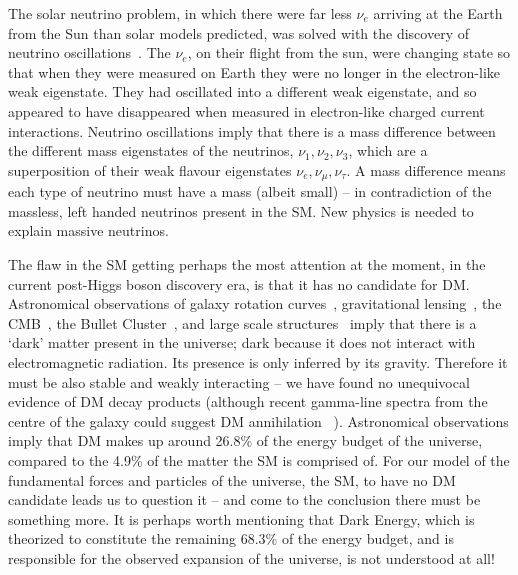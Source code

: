 %

The solar neutrino problem, in which there were far less $\nu_{e}$ arriving at the Earth from the Sun than solar models predicted, 
was solved with the discovery of neutrino oscillations~\cite{SolarNeut}. 
The $\nu_{e}$, on their flight from the sun, were changing state so that when they were measured on Earth they were no longer in the electron-like weak eigenstate. They had oscillated into a different weak eigenstate, and so appeared to have disappeared when measured in electron-like charged current interactions. 
Neutrino oscillations imply that there is a mass difference between the different mass eigenstates of the neutrinos, $\nu_{1}, \nu_{2}, \nu_{3}$, which are a superposition of their weak flavour eigenstates $\nu_{e}, \nu_{\mu}, \nu_{\tau}$.
A mass difference means each type of neutrino must have a mass (albeit small) -- in contradiction of the massless, left handed neutrinos present in the \ac{SM}.
New physics is needed to explain massive neutrinos.


The flaw in the \ac{SM} getting perhaps the most attention at the moment, in the current post-Higgs boson discovery era, is that it has no candidate for \ac{DM}. 
Astronomical observations of galaxy rotation curves~\cite{GalRotCurves}, gravitational lensing~\cite{GravLensing1,GravLensing2}, the \ac{CMB}~\cite{Planck2013}, the Bullet Cluster~\cite{bulletCluster}, and large scale structures~\cite{LargeScaleStructuresDM} imply that there is a `dark' matter present in the universe; 
dark because it does not interact with electromagnetic radiation. 
Its presence is only inferred by its gravity. 
Therefore it must be also stable and weakly interacting -- we have found no unequivocal evidence of \ac{DM} decay products (although recent gamma-line spectra from the centre of the galaxy could suggest \ac{DM} annihilation~\cite{FermiDMgamma} ). 
Astronomical observations imply that \ac{DM} makes up around 26.8\% of the energy budget of the universe, compared to the 4.9\% of the matter the \ac{SM} is comprised of. 
For our model of the fundamental forces and particles of the universe, the \ac{SM}, 
to have no \ac{DM} candidate leads us to question it -- 
and come to the conclusion there must be something more.
It is perhaps worth mentioning that Dark Energy, 
which is theorized to constitute the remaining 68.3\% of the energy budget, 
and is responsible for the observed expansion of the universe, is not understood at all!


